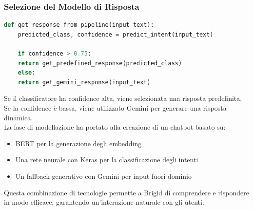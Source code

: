 \documentclass[12pt, letterpaper]{article}
\begin{document}
\subsubsection{Selezione del Modello di Risposta}
\begin{lstlisting}[language=Python]
	def get_response_from_pipeline(input_text):
	predicted_class, confidence = predict_intent(input_text)
	
	if confidence > 0.75:
	return get_predefined_response(predicted_class)
	else:
	return get_gemini_response(input_text)
\end{lstlisting}
Se il classificatore ha confidence alta, viene selezionata una risposta predefinita. Se la confidence è bassa, viene utilizzato Gemini per generare una risposta dinamica.\\
\newpage
La fase di modellazione ha portato alla creazione di un chatbot basato su:
\begin{itemize}
	\item BERT per la generazione degli embedding
	\item Una rete neurale con Keras per la classificazione degli intenti
	\item Un fallback generativo con Gemini per input fuori dominio
\end{itemize}
Questa combinazione di tecnologie permette a Brigid di comprendere e rispondere in modo efficace, garantendo un'interazione naturale con gli utenti.

\newpage
\end{document}
